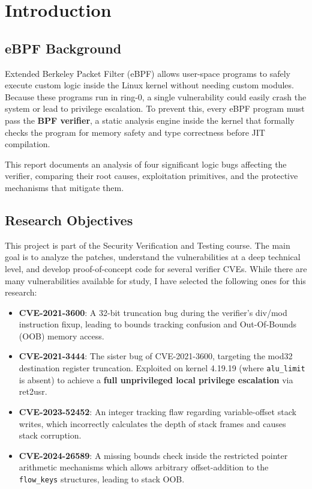\chapter{Introduction}

\section{eBPF Background}
Extended Berkeley Packet Filter (eBPF) allows user-space programs to safely execute custom logic inside the Linux kernel without needing custom modules. Because these programs run in ring-0, a single vulnerability could easily crash the system or lead to privilege escalation. To prevent this, every eBPF program must pass the \textbf{BPF verifier}, a static analysis engine inside the kernel that formally checks the program for memory safety and type correctness before JIT compilation. 

This report documents an analysis of four significant logic bugs affecting the verifier, comparing their root causes, exploitation primitives, and the protective mechanisms that mitigate them.

\section{Research Objectives}
This project is part of the Security Verification and Testing course. The main goal is to analyze the patches, understand the vulnerabilities at a deep technical level, and develop proof-of-concept code for several verifier CVEs. While there are many vulnerabilities available for study, I have selected the following ones for this research:
\begin{itemize}
    \item \textbf{CVE-2021-3600}: A 32-bit truncation bug during the verifier's div/mod instruction fixup, leading to bounds tracking confusion and Out-Of-Bounds (OOB) memory access.
    \item \textbf{CVE-2021-3444}: The sister bug of CVE-2021-3600, targeting the mod32 destination register truncation. Exploited on kernel 4.19.19 (where \texttt{alu\_limit} is absent) to achieve a \textbf{full unprivileged local privilege escalation} via ret2usr.
    \item \textbf{CVE-2023-52452}: An integer tracking flaw regarding variable-offset stack writes, which incorrectly calculates the depth of stack frames and causes stack corruption.
    \item \textbf{CVE-2024-26589}: A missing bounds check inside the restricted pointer arithmetic mechanisms which allows arbitrary offset-addition to the \texttt{flow\_keys} structures, leading to stack OOB.
\end{itemize}

